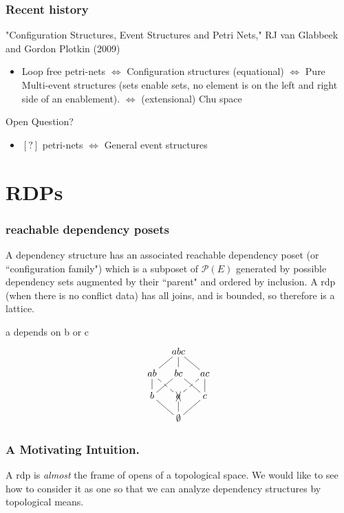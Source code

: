 \documentclass{beamer}
\newcommand{\Pc}{\mathcal{P}}
\begin{document}
\begin{frame}
\frametitle{Recent history}
"Configuration Structures, Event Structures and Petri Nets," RJ van Glabbeek and Gordon Plotkin (2009)
\begin{itemize}
\item Loop free petri-nets
\linebreak \(\Leftrightarrow\) Configuration structures (equational)
\linebreak \(\Leftrightarrow\) Pure Multi-event structures (sets enable sets, no element is on the left and right side of an enablement).
\linebreak \(\Leftrightarrow\) (extensional) Chu space
\end{itemize}

Open Question?
\begin{itemize}
\item \([?]\) petri-nets
\linebreak \(\Leftrightarrow\) General event structures
\end{itemize}
\end{frame}

\section{RDPs}
\begin{frame}
\frametitle{reachable dependency posets}
A dependency structure has an associated reachable dependency poset (or ``configuration family") which is a subposet of \(\Pc(E)\) generated by possible dependency sets augmented by their ``parent" and ordered by inclusion. A rdp (when there is no conflict data) has all joins, and is bounded, so therefore is a lattice.
\begin{block}{a depends on b or c}
\begin{equation*}
    \xymatrix@=1em{& abc \ar@{-}[dl] \ar@{-}[d] \ar@{-}[dr] & \\
      ab \ar@{-}[d] \ar@{--}[dr] & bc \ar@{-}[dl] \ar@{-}[dr] &
        ac \ar@{-}[d] \ar@{--}[dl] \\
      b \ar@{-}[dr] & \xcancel{a} \ar@{--}[d] & c \ar@{-}[dl] \\
       & \emptyset &}
\end{equation*}
\end{block}
\end{frame}

\begin{frame}
\frametitle{A Motivating Intuition.}
A rdp is \textit{almost} the frame of opens of a topological space. We would like to see how to consider it as one so that we can analyze dependency structures by topological means.
\end{frame}
\end{document}
